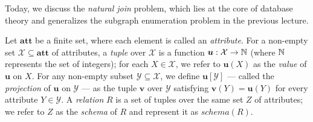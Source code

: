 



\usepackage{wasysym}

\title{}
\author{}
\date{}


\def\C{\mathcal{C}}
\def\E{\mathcal{E}}
\def\FF{\EuScript{F}}
\def\G{\mathcal{G}}
\def\GG{\EuScript{G}}
\def\H{\mathcal{H}}
\def\I{\mathcal{I}}
\def\J{\mathcal{J}}
\def\L{\mathcal{L}}
\def\Q{\mathcal{Q}}
\def\S{\mathcal{S}}
\def\T{\mathcal{T}}
\def\V{\mathcal{V}}
\def\W{\mathscr{W}}
\def\X{\mathcal{X}}
\def\Y{\mathcal{Y}}
\def\Z{\mathcal{Z}}
\def\att{\mit{diffatt}}
\def\boldatt{\mathbf{att}}
\def\ext{\mathit{ext}}
\def\join{\mathit{join}}
\def\schema{\mathit{schema}}


\def\extraspacing{\vspace{4mm} \noindent}
\def\vgap{\vspace{4mm}}
\def\vslit{\vspace{2mm}}




Today, we discuss the {\em natural join} problem, which lies at the core of database theory and generalizes the subgraph enumeration problem in the previous lecture.

\vgap

Let $\boldatt$ be a finite set, where each element is called an {\em attribute}. For a non-empty set $\X \subseteq \boldatt$ of attributes, a {\em tuple} over $\X$ is a function $\bm{u}: \X \rightarrow \intdom$ (where $\mathbb{N}$ represents the set of integers); for each $X \in \X$, we refer to $\bm{u}(X)$ as the {\em value} of $\bm{u}$ on $X$. For any non-empty subset $\Y \subseteq \X$, we define $\bm{u}[\Y]$ --- called the {\em projection} of $\bm{u}$ on $\Y$ --- as the tuple $\bm{v}$ over $\Y$ satisfying $\bm{v}(Y) = \bm{u}(Y)$ for every attribute $Y \in \Y$. A {\em relation} $R$ is a set of tuples over the same set $Z$ of attributes; we refer to $Z$ as the {\em schema} of $R$ and represent it as $\schema(R)$.

\vgap

